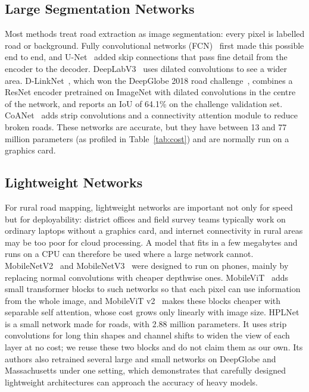 \documentclass{ieeeaccess}
\begin{document}
\subsection{Large Segmentation Networks}

Most methods treat road extraction as image segmentation: every pixel is labelled road or background. Fully convolutional networks (FCN)~\cite{long2015fcn} first made this possible end to end, and U-Net~\cite{ronneberger2015unet} added skip connections that pass fine detail from the encoder to the decoder. DeepLabV3~\cite{chen2017deeplab} uses dilated convolutions to see a wider area. D-LinkNet~\cite{zhou2018dlinknet}, which won the DeepGlobe 2018 road challenge~\cite{demir2018deepglobe}, combines a ResNet encoder pretrained on ImageNet with dilated convolutions in the centre of the network, and reports an IoU of 64.1\% on the challenge validation set. CoANet~\cite{mei2021coanet} adds strip convolutions and a connectivity attention module to reduce broken roads. These networks are accurate, but they have between 13 and 77 million parameters (as profiled in Table~\ref{tab:cost}) and are normally run on a graphics card.

\subsection{Lightweight Networks}

For rural road mapping, lightweight networks are important not only for speed but for deployability: district offices and field survey teams typically work on ordinary laptops without a graphics card, and internet connectivity in rural areas may be too poor for cloud processing. A model that fits in a few megabytes and runs on a CPU can therefore be used where a large network cannot. MobileNetV2~\cite{sandler2018mobilenetv2} and MobileNetV3~\cite{howard2019mobilenetv3} were designed to run on phones, mainly by replacing normal convolutions with cheaper depthwise ones. MobileViT~\cite{mehta2022mobilevit} adds small transformer blocks to such networks so that each pixel can use information from the whole image, and MobileViT v2~\cite{mehta2023separable} makes these blocks cheaper with separable self attention, whose cost grows only linearly with image size. HPLNet~\cite{cui2025hplnet} is a small network made for roads, with 2.88 million parameters. It uses strip convolutions for long thin shapes and channel shifts to widen the view of each layer at no cost; we reuse these two blocks and do not claim them as our own. Its authors also retrained several large and small networks on DeepGlobe and Massachusetts under one setting, which demonstrates that carefully designed lightweight architectures can approach the accuracy of heavy models.
\end{document}
